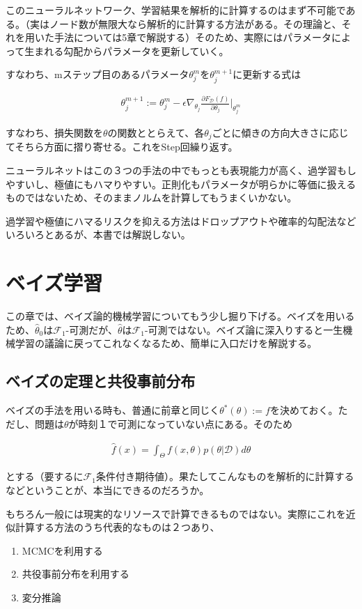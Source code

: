 \documentclass[dvipdfmx, a4paper]{jsarticle}
\begin{document}
このニューラルネットワーク、学習結果を解析的に計算するのはまず不可能である。（実はノード数が無限大なら解析的に計算する方法がある。その理論と、それを用いた手法については5章で解説する）そのため、実際にはパラメータによって生まれる勾配からパラメータを更新していく。

すなわち、mステップ目のあるパラメータ$\theta^m_j$を$\theta^{m+1}_j$に更新する式は

\begin{align}
\theta^{m+1}_j:=\theta^m_j-\epsilon\nabla_{\theta_j}\frac{\partial F_\mathcal{D}(f)}{\partial \theta_j}|_{\theta^m_j}
\end{align}

すなわち、損失関数を$\theta$の関数ととらえて、各$\theta_j$ごとに傾きの方向大きさに応じてそちら方面に摺り寄せる。これをStep回繰り返す。

ニューラルネットはこの３つの手法の中でもっとも表現能力が高く、過学習もしやすいし、極値にもハマりやすい。正則化もパラメータが明らかに等価に扱えるものではないため、そのままノルムを計算してもうまくいかない。

過学習や極値にハマるリスクを抑える方法はドロップアウトや確率的勾配法などいろいろとあるが、本書では解説しない。

\newpage
\section{ベイズ学習}
この章では、ベイズ論的機械学習についてもう少し掘り下げる。ベイズを用いるため、$\hat{\theta}_0$は$\mathcal{F}_1$-可測だが、$\hat{\theta}$は$\mathcal{F}_1$-可測ではない。ベイズ論に深入りすると一生機械学習の議論に戻ってこれなくなるため、簡単に入口だけを解説する。


\subsection{ベイズの定理と共役事前分布}
ベイズの手法を用いる時も、普通に前章と同じく$\theta^*(\theta):=f$を決めておく。ただし、問題は$\theta$が時刻１で可測になっていない点にある。そのため

\begin{align}
\hat{f}(x)=\int_\Theta f(x,\theta)p(\theta|\mathcal{D})d\theta
\end{align}

とする（要するに$\mathcal{F}_1$条件付き期待値）。果たしてこんなものを解析的に計算するなどということが、本当にできるのだろうか。

もちろん一般には現実的なリソースで計算できるものではない。実際にこれを近似計算する方法のうち代表的なものは２つあり、
\begin{enumerate}
\item MCMCを利用する
\item 共役事前分布を利用する
\item 変分推論
\end{enumerate}
\end{document}
